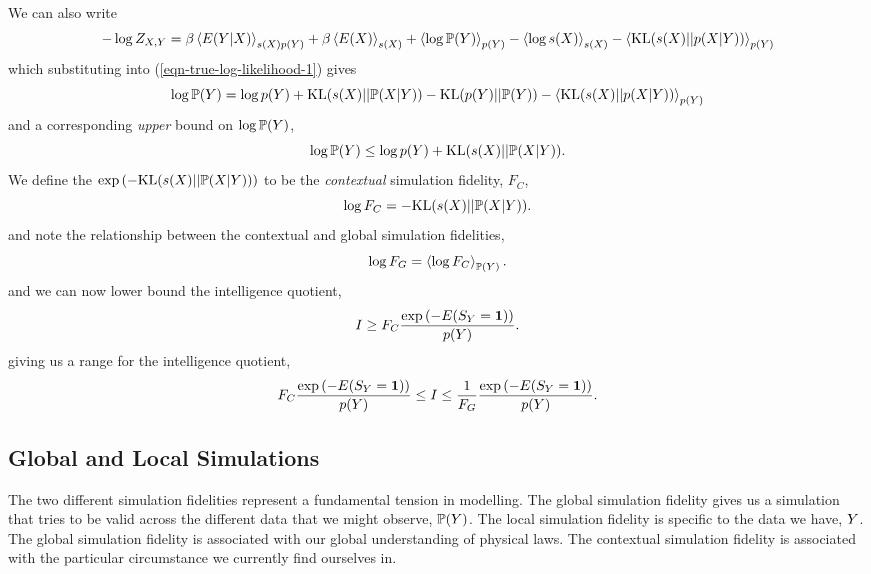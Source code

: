 \documentclass[]{article}
\begin{document}
We can also write
\[
- \log Z_{X,Y} =
\beta\left\langle E(Y |
  X) \right\rangle_{s(X)p(Y)}
+ \beta\left\langle E(X) \right\rangle_{s(X )} +
\left\langle \log \mathbb{P}(Y) \right\rangle_{p(Y)}
-\left\langle \log s(X) \right\rangle_{s(X)} -
\left\langle \text{KL}(s(X) ||
  p(X |
  Y)) \right\rangle_{p(Y)}
\]
which substituting into (\ref{eqn-true-log-likelihood-1}) gives
\[
\log \mathbb{P}(Y) = \log p(Y) +
\text{KL}(s(X)||\mathbb{P}(X|Y))
- \text{KL}(p(Y) || \mathbb{P}(Y))
- \left\langle \text{KL}(s(X) ||
  p(X |
  Y)) \right\rangle_{p(Y)}
\]
and a corresponding \emph{upper} bound on $\log \mathbb{P}(Y)$, 
\[
\log \mathbb{P}(Y) \leq \log p(Y)
+
\text{KL}(s(X)||\mathbb{P}(X|Y)).
\]
We define the $\exp\left(-
\text{KL}(s(X)||\mathbb{P}(X|Y))\right)$
to be the \emph{contextual} simulation fidelity, $F_C$,
\[
\log F_C =
-\text{KL}(s(X)||\mathbb{P}(X|Y)).
\]
and note the relationship between the contextual and global simulation
fidelities,
\[
\log F_G = \left\langle \log F_C \right\rangle_{\mathbb{P}(Y)}.
\]
and we can now lower bound the intelligence quotient,
\[
I \geq F_C \frac{\exp\left(-E(S_Y=
  \textbf{1})\right)}{p(Y)}.
\]
giving us a range for the intelligence quotient,
\[
F_C \frac{\exp\left(-E(S_Y=
  \textbf{1})\right)}{p(Y)} \leq I \leq
\frac{1}{F_G}\frac{\exp\left(-E(S_Y=
  \textbf{1})\right)}{p(Y)}.
\]

\subsection{Global and Local Simulations}

The two different simulation fidelities represent a fundamental
tension in modelling. The global simulation fidelity gives us a
simulation that tries to be valid across the different data that we
might observe, $\mathbb{P}(Y)$. The local simulation
fidelity is specific to the data we have, $Y$. The global
simulation fidelity is associated with our global understanding of
physical laws. The contextual simulation fidelity is associated with
the particular circumstance we currently find ourselves in.
\end{document}
